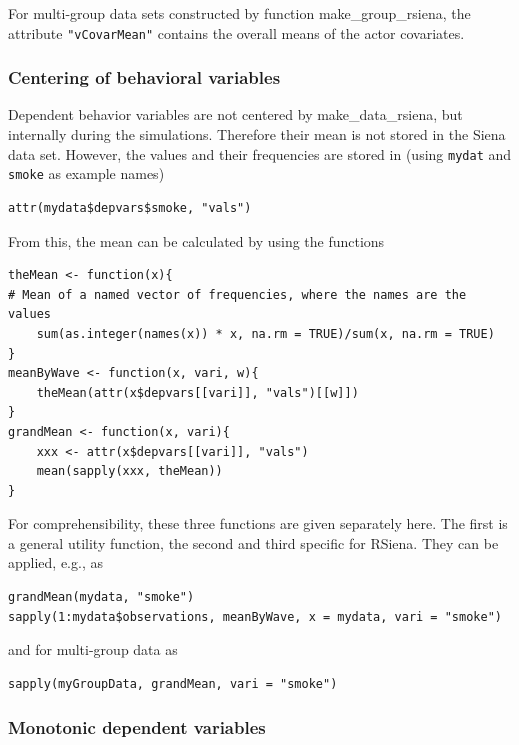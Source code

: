 \documentclass[a4paper,fleqn,11pt]{article}
\newcommand{\+}{\, + \,}
\newcommand{\sfn}[1]{\textsf{#1}}
\newcommand{\rs}{{\sf RSiena}}
\begin{document}
For multi-group data sets constructed by function \sfn{make\_group\_rsiena},
the attribute \texttt{"vCovarMean"} contains the overall means
of the actor covariates.


\subsubsection{Centering of behavioral variables}

Dependent behavior variables are not centered by \textsf{make\_data\_rsiena},
but internally during the simulations.
Therefore their mean is not stored in the Siena data set.
However, the values and their frequencies are stored in
(using \texttt{mydat} and \texttt{smoke} as example names)
\begin{verbatim}
attr(mydata$depvars$smoke, "vals")
\end{verbatim}
From this, the mean can be calculated by using the functions
\begin{verbatim}
theMean <- function(x){
# Mean of a named vector of frequencies, where the names are the values
    sum(as.integer(names(x)) * x, na.rm = TRUE)/sum(x, na.rm = TRUE)
}
meanByWave <- function(x, vari, w){
    theMean(attr(x$depvars[[vari]], "vals")[[w]])
}
grandMean <- function(x, vari){
    xxx <- attr(x$depvars[[vari]], "vals")
    mean(sapply(xxx, theMean))
}
\end{verbatim}
For comprehensibility, these three functions are given separately here.
The first is a general utility function, the second and third specific for \rs.
They can be applied, e.g., as
\begin{verbatim}
grandMean(mydata, "smoke")
sapply(1:mydata$observations, meanByWave, x = mydata, vari = "smoke")
\end{verbatim}
and for multi-group data as
\begin{verbatim}
sapply(myGroupData, grandMean, vari = "smoke")
\end{verbatim}





\subsubsection{Monotonic dependent variables}
\label{S_monotone}
\end{document}
